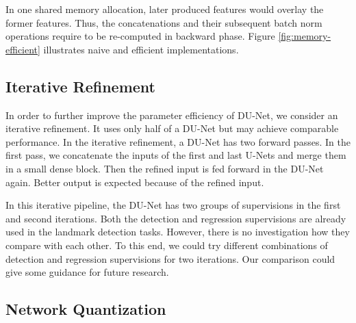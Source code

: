 In one shared memory allocation, later produced features would overlay the former features. Thus, the concatenations and their subsequent batch norm operations require to be re-computed in backward phase. Figure \ref{fig:memory-efficient} illustrates naive and efficient implementations.



\subsection{Iterative Refinement}
In order to further improve the parameter efficiency of DU-Net, we consider an iterative refinement. It uses only half of a DU-Net but may achieve comparable performance. In the iterative refinement, a DU-Net has two forward passes. In the first pass, we concatenate the inputs of the first and last U-Nets and merge them in a small dense block. Then the refined input is fed forward in the DU-Net again. Better output is expected because of the refined input. 

In this iterative pipeline, the DU-Net has two groups of supervisions in the first and second iterations. Both the detection and regression supervisions \cite{bulat2016human} are already used in the landmark detection tasks. However, there is no investigation how they compare with each other. To this end, we could try different combinations of detection and regression supervisions for two iterations. Our comparison could give some guidance for future research. 

\subsection{Network Quantization}

